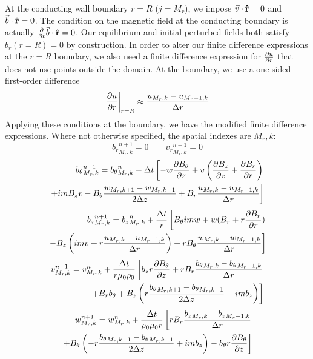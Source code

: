 \documentclass[%
 reprint,
 amsmath,amssymb,
 aps,
]{revtex4-2}
\begin{document}
At the conducting wall boundary $r = R$ ($j=M_r$), we impose $\vec v \cdot \vu r = 0$ and $\vec b \cdot \vu r = 0$. The condition on the magnetic field at the conducting boundary is actually $\pdv{}{t} \vec b \cdot \vu r = 0$. Our equilibrium and initial perturbed fields both satisfy $b_r(r=R) = 0$ by construction. In order to alter our finite difference expressions at the $r = R$ boundary, we also need a finite difference expression for $\pdv{u}{r}$ that does not use points outside the domain. At the boundary, we use a one-sided first-order difference
\begin{equation}
\left. \pdv{u}{r} \right|_{r = R} \approx \frac{u_{M_r, k} - u_{M_r-1, k}}{\Delta r}
\end{equation}
Applying these conditions at the boundary, we have the modified finite difference expressions. Where not otherwise specified, the spatial indexes are $M_r, k$:
\begin{equation}
{b_r}_{M_r, k} ^{n+1} = 0 \qquad {v_r}_{M_r, k} ^{n+1} = 0
\end{equation}
\begin{eqnarray*}
{b_\theta} _{M_r, k} ^{n+1} = {b_\theta}_{M_r, k} ^{n} + \Delta t \left[ - w \pdv{B_\theta}{z} + v \left( \pdv{B_z}{z} + \pdv{B_r}{r} \right) \right. \\
\left.  + i m B_z v - B_\theta \frac{w_{M_r, k+1}- w_{M_r, k-1}}{2 \Delta z} + B_r \frac{u_{M_r, k} - u_{M_r-1, k}}{\Delta r} \right] \\
\end{eqnarray*}
\begin{eqnarray*}
{b_z}_{M_r, k} ^{n+1} = {b_z}_{M_r, k} ^{n} + \frac{\Delta t}{r} \left[B_\theta i m w + w (B_r + r \pdv{B_r}{r}) \right. \\
\left. - B_z\left(i m v + r \frac{u_{M_r, k}-u_{M_r-1, k}}{\Delta r} \right) + r B_\theta \frac{w_{M_r, k}-w_{M_r-1, k}}{\Delta r} \right] \label{bc-bz-r}
\end{eqnarray*}
\begin{eqnarray*}
v_{M_r, k} ^{n+1} = v_{M_r, k} ^{n} + \frac{\Delta t}{r \mu_0 \rho_0} \left[ b_z r \pdv{B_\theta}{z} + r B_r \frac{{b_\theta}_{M_r, k} - {b_\theta}_{M_r-1, k}}{\Delta r} \right. \\
\left. + B_r b_\theta  + B_z \left( r \frac{{b_\theta}_{M_r, k+1} - {b_\theta}_{M_r, k-1}}{2 \Delta z} - i m b_z \right) \right]
\end{eqnarray*}
\begin{eqnarray*}
w_{M_r, k} ^{n+1} = w_{M_r, k} ^n + \frac{\Delta t}{\rho_0 \mu_0 r} \left[  r B_r \frac{{b_z}_{M_r, k} - {b_z}_{M_r - 1, k}}{\Delta r} \right. \\
\left. + B_\theta \left( - r \frac{{b_\theta}_{M_r, k+1} - {b_\theta}_{M_r, k-1}}{2 \Delta z} + i m b_z \right) - b_\theta r \pdv{B_\theta}{z} \right]
\end{eqnarray*}
\end{document}
